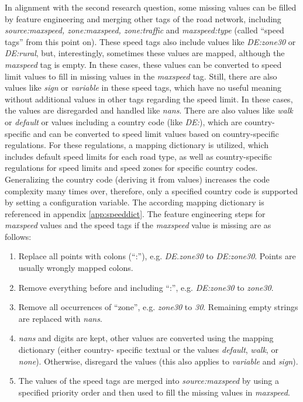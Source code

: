 In alignment with the second research question, some missing values can be filled by feature engineering and merging other tags of the road network, including \emph{source:maxspeed, zone:maxspeed, zone:traffic} and \emph{maxspeed:type} (called \enquote{speed tags} from this point on). These speed tags also include values like \emph{DE:zone30} or \emph{DE:rural}, but, interestingly, sometimes these values are mapped, although the \emph{maxspeed} tag is empty. In these cases, these values can be converted to speed limit values to fill in missing values in the \emph{maxspeed} tag. Still, there are also values like \emph{sign} or \emph{variable} in these speed tags, which have no useful meaning without additional values in other tags regarding the speed limit. In these cases, the values are disregarded and handled like \emph{\glspl{nan}}. There are also values like \emph{walk} or \emph{default} or values including a country code (like \emph{DE:}), which are country-specific and can be converted to speed limit values based on country-specific regulations. For these regulations, a mapping dictionary is utilized, which includes default speed limits for each road type, as well as country-specific regulations for speed limits and speed zones for specific country codes. Generalizing the country code (deriving it from values) increases the code complexity many times over, therefore, only a specified country code is supported by setting a configuration variable. The according mapping dictionary is referenced in appendix \ref{app:speeddict}. The feature engineering steps for \emph{maxspeed} values and the speed tags if the \emph{maxspeed} value is missing are as follows:

\begin{enumerate}
    \item Replace all points with colons (\enquote{:}), e.g. \emph{DE.zone30} to \emph{DE:zone30}. Points are usually wrongly mapped colons.
    \item Remove everything before and including \enquote{:}, e.g. \emph{DE:zone30} to \emph{zone30}.
    \item Remove all occurrences of \enquote{zone}, e.g. \emph{zone30} to \emph{30}. Remaining empty strings are replaced with \emph{\glspl{nan}}.
    \item \emph{\glspl{nan}} and digits are kept, other values are converted using the mapping dictionary (either country- specific textual or the values \emph{default}, \emph{walk}, or \emph{none}). Otherwise, disregard the values (this also applies to \emph{variable} and \emph{sign}).
    \item The values of the speed tags are merged into \emph{source:maxspeed} by using a specified priority order and then used to fill the missing values in \emph{maxspeed}.
\end{enumerate}

